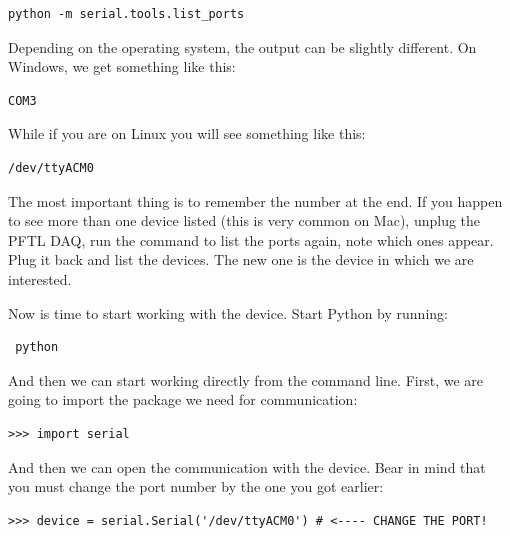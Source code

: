 \begin{verbatim}
python -m serial.tools.list_ports
\end{verbatim}


Depending on the operating system, the output can be slightly different. On Windows, we get something like this:

\begin{verbatim}
COM3
\end{verbatim}

While if you are on Linux you will see something like this:

\begin{verbatim}
/dev/ttyACM0
\end{verbatim}

The most important thing is to remember the number at the end. If you happen to see more than one device listed (this is very common on Mac), unplug the {PFTL DAQ}, run the command to list the ports again, note which ones appear. Plug it back and list the devices. The new one is the device in which we are interested.

Now is time to start working with the device. Start Python by running:

\begin{verbatim}
 python
\end{verbatim}

And then we can start working directly from the command line. First, we are going to import the package we need for communication:

\begin{verbatim}
>>> import serial
\end{verbatim}


And then we can open the communication with the device. Bear in mind that you must change the port number by the one you got earlier:

\begin{verbatim}
>>> device = serial.Serial('/dev/ttyACM0') # <---- CHANGE THE PORT!
\end{verbatim}

